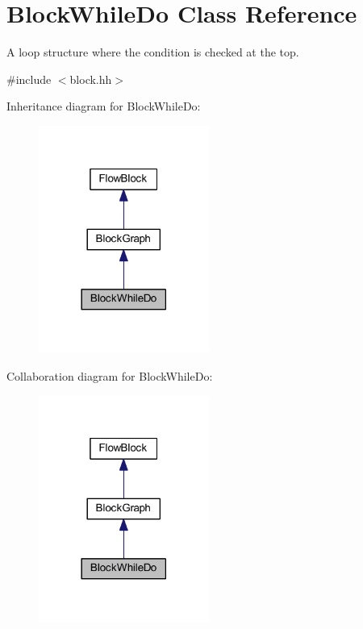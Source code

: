 \hypertarget{class_block_while_do}{}\section{Block\+While\+Do Class Reference}
\label{class_block_while_do}


A loop structure where the condition is checked at the top.  




{\ttfamily \#include $<$block.\+hh$>$}



Inheritance diagram for Block\+While\+Do\+:
\nopagebreak
\begin{figure}[H]
\begin{center}
\leavevmode
\includegraphics[width=158pt]{class_block_while_do__inherit__graph}
\end{center}
\end{figure}


Collaboration diagram for Block\+While\+Do\+:
\nopagebreak
\begin{figure}[H]
\begin{center}
\leavevmode
\includegraphics[width=158pt]{class_block_while_do__coll__graph}
\end{center}
\end{figure}
